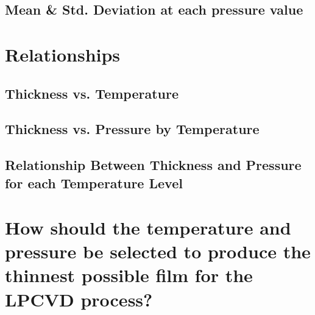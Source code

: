 \documentclass[letterpaper]{article}
\begin{document}
  \subsection{Mean \& Std. Deviation at each pressure value}

\section{Relationships}
  \subsection{Thickness vs. Temperature}
  \subsection{Thickness vs. Pressure by Temperature}
  \subsection{Relationship Between Thickness and Pressure for each Temperature Level}

\section{How should the temperature and pressure be selected to produce the thinnest possible film for the LPCVD
process?}
\end{document}
